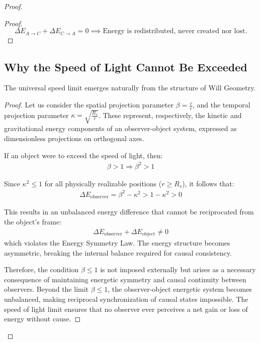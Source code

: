 \documentclass{article}
\begin{document}
\begin{proof}
\begin{proof}
\[
\boxed{

\Delta E_{A\rightarrow C} + \Delta E_{C\rightarrow A} = 0 \implies \text{Energy is redistributed, never created nor lost.}}

\]
\end{proof}

\subsection{Why the Speed of Light Cannot Be Exceeded}

\begin{theorem}
The universal speed limit emerges naturally from the structure of Will Geometry.
\end{theorem}

\begin{proof}
Let us consider the spatial projection parameter $\beta = \frac{v}{c}$, and the temporal projection parameter $\kappa = \sqrt{\frac{R_s}{r}}$. These represent, respectively, the kinetic and gravitational energy components of an observer-object system, expressed as dimensionless projections on orthogonal axes.

If an object were to exceed the speed of light, then:
\begin{align}
\beta > 1 \Rightarrow \beta^2 > 1
\end{align}

Since $\kappa^2 \leq 1$ for all physically realizable positions ($r \geq R_s$), it follows that:
\begin{align}
\Delta E_{\text{observer}} = \beta^2 - \kappa^2 > 1 - \kappa^2 > 0
\end{align}

This results in an unbalanced energy difference that cannot be reciprocated from the object's frame:
\begin{align}
\Delta E_{\text{observer}} + \Delta E_{\text{object}} \neq 0
\end{align}
which violates the Energy Symmetry Law. The energy structure becomes asymmetric, breaking the internal balance required for causal consistency.

Therefore, the condition $\beta \leq 1$ is not imposed externally but arises as a necessary consequence of maintaining energetic symmetry and causal continuity between observers. Beyond the limit $\beta \leq 1$, the observer-object energetic system becomes unbalanced, making reciprocal synchronization of causal states impossible. The speed of light limit ensures that no observer ever perceives a net gain or loss of energy without cause.


\end{proof}
\end{proof}
\end{document}

